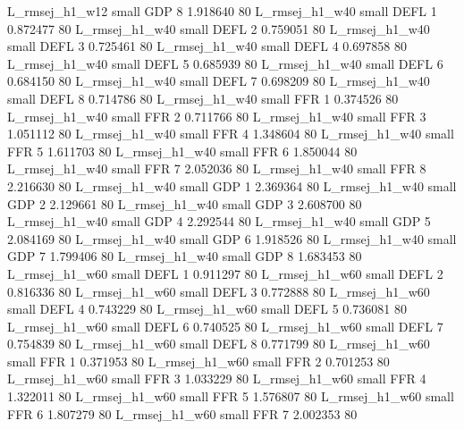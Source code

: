 L_rmsej_h1_w12      small      GDP                 8 1.918640 80
L_rmsej_h1_w40      small     DEFL                 1 0.872477 80
L_rmsej_h1_w40      small     DEFL                 2 0.759051 80
L_rmsej_h1_w40      small     DEFL                 3 0.725461 80
L_rmsej_h1_w40      small     DEFL                 4 0.697858 80
L_rmsej_h1_w40      small     DEFL                 5 0.685939 80
L_rmsej_h1_w40      small     DEFL                 6 0.684150 80
L_rmsej_h1_w40      small     DEFL                 7 0.698209 80
L_rmsej_h1_w40      small     DEFL                 8 0.714786 80
L_rmsej_h1_w40      small      FFR                 1 0.374526 80
L_rmsej_h1_w40      small      FFR                 2 0.711766 80
L_rmsej_h1_w40      small      FFR                 3 1.051112 80
L_rmsej_h1_w40      small      FFR                 4 1.348604 80
L_rmsej_h1_w40      small      FFR                 5 1.611703 80
L_rmsej_h1_w40      small      FFR                 6 1.850044 80
L_rmsej_h1_w40      small      FFR                 7 2.052036 80
L_rmsej_h1_w40      small      FFR                 8 2.216630 80
L_rmsej_h1_w40      small      GDP                 1 2.369364 80
L_rmsej_h1_w40      small      GDP                 2 2.129661 80
L_rmsej_h1_w40      small      GDP                 3 2.608700 80
L_rmsej_h1_w40      small      GDP                 4 2.292544 80
L_rmsej_h1_w40      small      GDP                 5 2.084169 80
L_rmsej_h1_w40      small      GDP                 6 1.918526 80
L_rmsej_h1_w40      small      GDP                 7 1.799406 80
L_rmsej_h1_w40      small      GDP                 8 1.683453 80
L_rmsej_h1_w60      small     DEFL                 1 0.911297 80
L_rmsej_h1_w60      small     DEFL                 2 0.816336 80
L_rmsej_h1_w60      small     DEFL                 3 0.772888 80
L_rmsej_h1_w60      small     DEFL                 4 0.743229 80
L_rmsej_h1_w60      small     DEFL                 5 0.736081 80
L_rmsej_h1_w60      small     DEFL                 6 0.740525 80
L_rmsej_h1_w60      small     DEFL                 7 0.754839 80
L_rmsej_h1_w60      small     DEFL                 8 0.771799 80
L_rmsej_h1_w60      small      FFR                 1 0.371953 80
L_rmsej_h1_w60      small      FFR                 2 0.701253 80
L_rmsej_h1_w60      small      FFR                 3 1.033229 80
L_rmsej_h1_w60      small      FFR                 4 1.322011 80
L_rmsej_h1_w60      small      FFR                 5 1.576807 80
L_rmsej_h1_w60      small      FFR                 6 1.807279 80
L_rmsej_h1_w60      small      FFR                 7 2.002353 80
